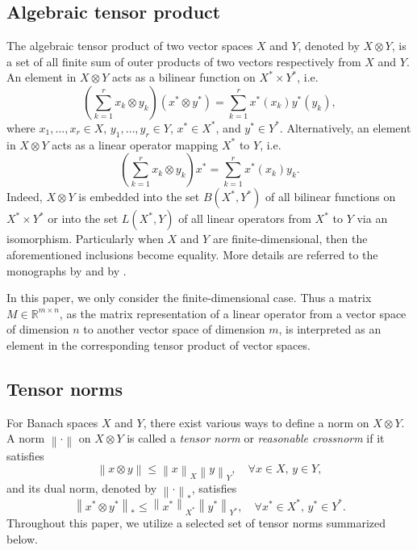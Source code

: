 \documentclass[11pt]{article}
\newcommand{\norm}[1]{\left \|#1 \right \|}
\begin{document}
\subsection{Algebraic tensor product}

The algebraic tensor product of two vector spaces $X$ and $Y$, denoted by $X \otimes Y$, is a set of all finite sum of outer products of two vectors respectively from $X$ and $Y$. 
An element in $X \otimes Y$ acts as a bilinear function on $X^* \times Y^*$, i.e. 
\[
\left(\sum_{k=1}^r x_k \otimes y_k \right) (x^* \otimes y^*) = \sum_{k=1}^r x^*(x_k) y^*(y_k),
\]
where $x_1, \dots, x_r \in X$, $y_1, \dots, y_r \in Y$, $x^* \in X^*$, and $y^* \in Y^*$. 
Alternatively, an element in $X \otimes Y$ acts as a linear operator mapping $X^*$ to $Y$, i.e. 
\[
\left(\sum_{k=1}^r x_k \otimes y_k \right) x^* = \sum_{k=1}^r x^*(x_k) y_k. 
\]
Indeed, $X \otimes Y$ is embedded into the set $B(X^*,Y^*)$ of all bilinear functions on $X^* \times Y^*$ or into the set $L(X^*,Y)$ of all linear operators from $X^*$ to $Y$ via an isomorphism. 
Particularly when $X$ and $Y$ are finite-dimensional, then the aforementioned inclusions become equality. 
More details are referred to the monographs by \citet{defant1992tensor} and by 
\citet{diestel2008metric}. 

In this paper, we only consider the finite-dimensional case. 
Thus a matrix $M \in \mathbb{R}^{m \times n}$, as the matrix representation of a linear operator from a vector space of dimension $n$ to another vector space of dimension $m$, is interpreted as an element in the corresponding tensor product of vector spaces.

\subsection{Tensor norms}

For Banach spaces $X$ and $Y$, there exist various ways to define a norm on $X \otimes Y$. 
A norm $\norm{\cdot}$ on $X \otimes Y$ is called a \textit{tensor norm} \citep[p. 147]{defant1992tensor} or \textit{reasonable crossnorm} \citep{grothendieck1956resume} \cite[p. 5]{diestel2008metric} if it satisfies 
\[
\norm{x \otimes y} \leq \norm{x}_X \norm{y}_Y, \quad \forall x \in X, \, y \in Y,
\]
and its dual norm, denoted by $\norm{\cdot}_*$, satisfies
\[
\norm{x^* \otimes y^*}_* \leq \norm{x^*}_{X^*} \norm{y^*}_{Y^*}, \quad \forall x^* \in X^*, \, y^* \in Y^*.
\]
Throughout this paper, we utilize a selected set of tensor norms summarized below. \\
\end{document}
